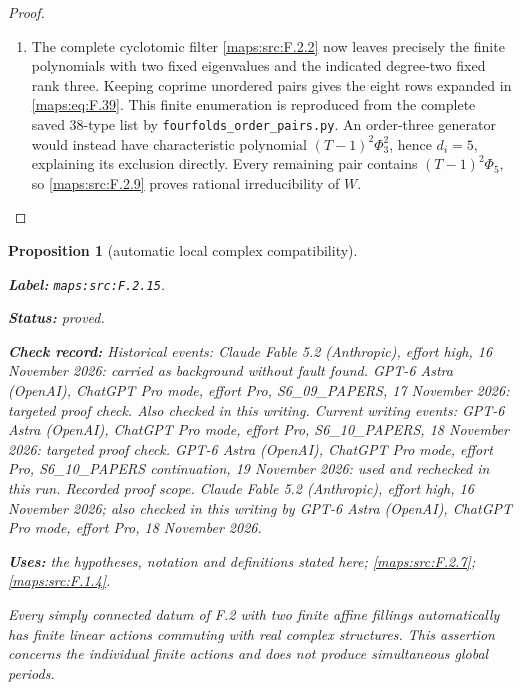 \documentclass[11pt,a4paper]{article}
\newtheorem{proposition}[proposition]{Proposition}
\theoremstyle{definition}
\newcommand{\StatementRecord}[4]{\par\smallskip\begingroup\upshape\raggedright\noindent\textbf{Label:} \nolinkurl{#1}.\par\noindent\textbf{Status:} #2.\par\noindent\textbf{Check record:} #3.\par\noindent\textbf{Uses:} #4.\par\endgroup\smallskip}
\begin{document}
\begin{proof}
\begin{enumerate}[label=\arabic*.]
\item The complete cyclotomic filter \ref{maps:src:F.2.2} now leaves precisely
the finite polynomials with two fixed eigenvalues and
the indicated degree-two fixed rank three.
Keeping coprime unordered pairs gives the eight rows
expanded in \eqref{maps:eq:F.39}.  This finite enumeration is reproduced
from the complete saved 38-type list by
\texttt{fourfolds\_order\_pairs.py}.
An order-three generator would instead have characteristic
polynomial $(T-1)^2\Phi_3^2$, hence $d_i=5$, explaining
its exclusion directly.
Every remaining pair contains $(T-1)^2\Phi_5$, so \ref{maps:src:F.2.9}
proves rational irreducibility of $W$.

\end{enumerate}
\end{proof}




\begin{proposition}[automatic local complex compatibility]\label{maps:src:F.2.15}
\StatementRecord{maps:src:F.2.15}{proved}{Historical events: Claude Fable 5.2 (Anthropic), effort high, 16 November 2026: carried as background without fault found. GPT-6 Astra (OpenAI), ChatGPT Pro mode, effort Pro, S6\_09\_PAPERS, 17 November 2026: targeted proof check. Also checked in this writing. Current writing events: GPT-6 Astra (OpenAI), ChatGPT Pro mode, effort Pro, S6\_10\_PAPERS, 18 November 2026: targeted proof check. GPT-6 Astra (OpenAI), ChatGPT Pro mode, effort Pro, S6\_10\_PAPERS continuation, 19 November 2026: used and rechecked in this run. \emph{Recorded proof scope.} Claude Fable 5.2 (Anthropic), effort high, 16 November 2026; also checked in this writing by GPT-6 Astra (OpenAI), ChatGPT Pro mode, effort Pro, 18 November 2026}{the hypotheses, notation and definitions stated here; \cref{maps:src:F.2.7}; \cref{maps:src:F.1.4}}


Every simply connected datum of F.2 with two finite affine
fillings automatically has finite linear actions commuting
with real complex structures.  This assertion concerns the
individual finite actions and does not produce simultaneous
global periods.

\end{proposition}
\end{document}
